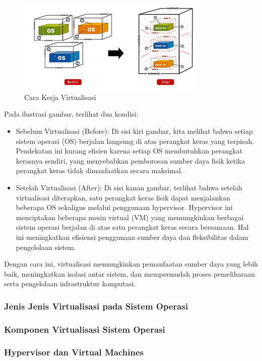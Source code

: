 \documentclass[12pt]{article}
\begin{document}
    \begin{figure}[h!]
    \centering
    \includegraphics[width=0.8\textwidth]{assets/carakerjavirtualisasi.jpg}
    \caption{Cara Kerja Virtualisasi}
    \label{fig:label_gambar}
\end{figure}
Pada ilustrasi gambar, terlihat dua kondisi:
\begin{itemize}
    \item Sebelum Virtualisasi (Before): Di sisi kiri gambar, kita melihat bahwa setiap sistem operasi (OS) berjalan langsung di atas perangkat keras yang terpisah. Pendekatan ini kurang efisien karena setiap OS membutuhkan perangkat kerasnya sendiri, yang menyebabkan pemborosan sumber daya fisik ketika perangkat keras tidak dimanfaatkan secara maksimal.
    \item Setelah Virtualisasi (After): Di sisi kanan gambar, terlihat bahwa setelah virtualisasi diterapkan, satu perangkat keras fisik dapat menjalankan beberapa OS sekaligus melalui penggunaan hypervisor. Hypervisor ini menciptakan beberapa mesin virtual (VM) yang memungkinkan berbagai sistem operasi berjalan di atas satu perangkat keras secara bersamaan. Hal ini meningkatkan efisiensi penggunaan sumber daya dan fleksibilitas dalam pengelolaan sistem.
\end{itemize}

Dengan cara ini, virtualisasi memungkinkan pemanfaatan sumber daya yang lebih baik, meningkatkan isolasi antar sistem, dan mempermudah proses pemeliharaan serta pengelolaan infrastruktur komputasi.


\subsubsection{Jenis Jenis Virtualisasi pada Sistem Operasi}
\subsubsection{Komponen Virtualisasi Sistem Operasi}
\subsubsection{Hypervisor dan Virtual Machines}
\end{document}
